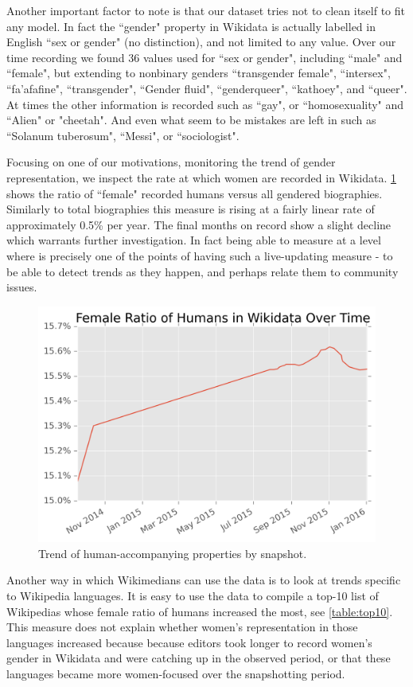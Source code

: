 \documentclass[letterpaper]{article}
\begin{document}
Another important factor to note is that our dataset tries not to clean itself to fit any model. In fact the ``gender" property in Wikidata is actually labelled in English ``sex or gender" (no distinction), and not limited to any value. Over our time recording we found 36 values used for ``sex or gender", including ``male" and ``female", but extending to nonbinary genders ``transgender female", ``intersex", ``fa'afafine", ``transgender", ``Gender fluid",  ``genderqueer", ``kathoey", and ``queer". At times the other information is recorded such as ``gay", or ``homosexuality" and ``Alien" or "cheetah". And even what seem to be mistakes are left in such as  ``Solanum tuberosum", ``Messi", or ``sociologist".

Focusing on one of our motivations, monitoring the trend of gender representation, we inspect the rate at which women are recorded in Wikidata. \ref{fig:frb} shows the ratio of ``female" recorded humans versus all gendered biographies. Similarly to total biographies this measure is rising at a fairly linear rate of approximately 0.5\% per year. The final months on record show a slight decline which warrants further investigation. In fact being able to measure at a level where is precisely one of the points of having such a live-updating measure - to be able to detect trends as they happen, and perhaps relate them to community issues. 

\begin{figure}
\label{fig:frb}
\includegraphics[scale=0.6]{figures/frbwikidata.png} 
\caption{Trend of human-accompanying properties by snapshot.}
\end{figure}

Another way in which Wikimedians can use the data is to look at trends specific to Wikipedia languages. It is easy to use the data to compile a top-10 list of Wikipedias whose female ratio of humans increased the most, see \ref{table:top10}. This measure does not explain whether women's representation in those languages increased because because editors took longer to record women's gender in Wikidata and were catching up in the observed period, or that these languages became more women-focused over the snapshotting period.
\end{document}
